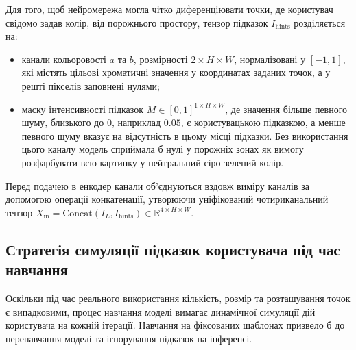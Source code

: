         Для того, щоб нейромережа могла чітко диференціювати точки, де користувач свідомо задав колір, від порожнього простору, тензор підказок $I_{\mathrm{hints}}$ розділяється на:
        \begin{itemize}[label=$\bullet$]
            \item канали кольоровості $a$ та $b$, розмірності $2 \times H \times W$, нормалізовані у $[-1, 1]$, які містять цільові хроматичні значення у координатах заданих точок, а у решті пікселів заповнені нулями;
            \item маску інтенсивності підказок $M \in [0, 1]^{1 \times H \times W}$, де значення більше певного шуму, близького до $0$, наприклад $0.05$, є користувацькою підказкою, а менше певного шуму вказує на відсутність в цьому місці підказки.
                Без використання цього каналу модель сприймала б нулі у порожніх зонах як вимогу розфарбувати всю картинку у нейтральний сіро-зелений колір.
        \end{itemize}

        Перед подачею в енкодер канали об'єднуються вздовж виміру каналів за допомогою операції конкатенації,
        утворюючи уніфікований чотириканальний тензор $X_{\mathrm{in}} = \mathrm{Concat}(I_L, I_{\mathrm{hints}}) \in \mathbb{R}^{4 \times H \times W}$.

        \subsection{Стратегія симуляції підказок користувача під час навчання}
            Оскільки під час реального використання кількість, розмір та розташування точок є випадковими,
            процес навчання моделі вимагає динамічної симуляції дій користувача на кожній ітерації.
            Навчання на фіксованих шаблонах призвело б до перенавчання моделі та ігнорування підказок на інференсі.

